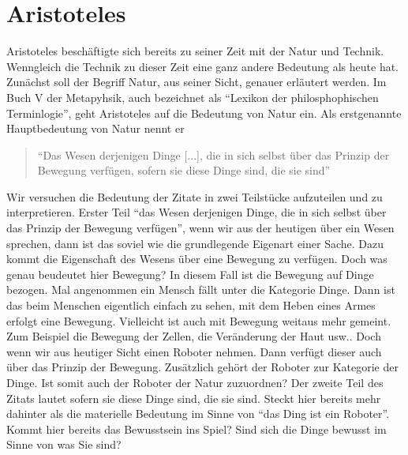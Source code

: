 \section{Aristoteles}
Aristoteles beschäftigte sich bereits zu seiner Zeit mit der Natur und Technik. Wenngleich die Technik zu dieser Zeit eine ganz andere Bedeutung als heute hat. Zunächst soll der Begriff Natur, aus seiner Sicht, genauer erläutert werden. Im Buch V der Metapyhsik, auch bezeichnet als \enquote{Lexikon der philosphophischen Terminlogie}, geht Aristoteles auf die Bedeutung von Natur ein. Als erstgenannte Hauptbedeutung von Natur nennt er
\begin{quote}
	\enquote{Das Wesen derjenigen Dinge [...], die in sich selbst über das Prinzip der Bewegung verfügen, sofern sie diese Dinge sind, die sie sind}
	\cite[1015a14 f.]{MetaphysikV} 
\end{quote}


Wir versuchen die Bedeutung der Zitate in zwei Teilstücke aufzuteilen und zu interpretieren. Erster Teil \enquote{das Wesen derjenigen Dinge, die in sich selbst über das Prinzip der Bewegung verfügen}, wenn wir aus der heutigen über ein Wesen sprechen, dann ist das soviel wie die grundlegende Eigenart einer Sache. Dazu kommt die Eigenschaft des Wesens über eine Bewegung zu verfügen. Doch was genau beudeutet hier Bewegung? In diesem Fall ist die Bewegung auf Dinge bezogen. Mal angenommen ein Mensch fällt unter die Kategorie Dinge. Dann ist das beim Menschen eigentlich einfach zu sehen, mit dem Heben eines Armes erfolgt eine Bewegung. Vielleicht ist auch mit Bewegung weitaus mehr gemeint. Zum Beispiel die Bewegung der Zellen, die Veränderung der Haut usw.. Doch wenn wir aus heutiger Sicht einen Roboter nehmen. Dann verfügt dieser auch über das Prinzip der Bewegung. Zusätzlich gehört der Roboter zur Kategorie der Dinge. Ist somit auch der Roboter der Natur zuzuordnen? Der zweite Teil des Zitats lautet \glqq sofern sie diese Dinge sind, die sie sind\grqq{}. Steckt hier bereits mehr dahinter als die materielle Bedeutung im Sinne von \enquote{das Ding ist ein Roboter}. Kommt hier bereits das Bewusstsein ins Spiel? Sind sich die Dinge bewusst im Sinne von was Sie sind?  

